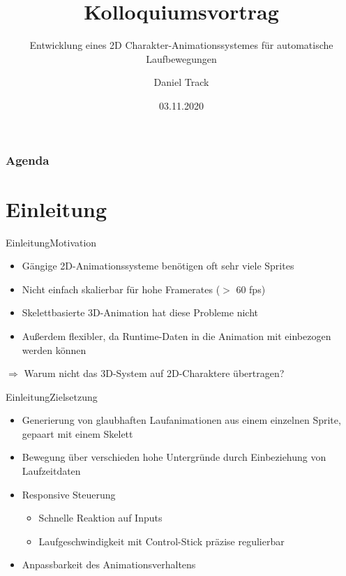 \documentclass[t,aspectratio=169,divpsnames]{beamer}
\title{Kolloquiumsvortrag}
\subtitle{Entwicklung eines 2D Charakter-Animationssystemes für automatische Laufbewegungen}
\author{Daniel Track}
\institute{Hochschule Trier}
\date{03.11.2020}
\begin{document}
\begin{frame}
    \titlepage
\end{frame}

\begin{frame}
    \frametitle{Agenda}
    \tableofcontents
\end{frame}

\section{Einleitung}
\begin{frame}{Einleitung}{Motivation}
    \begin{itemize}
        \item Gängige 2D-Animationssysteme benötigen oft sehr viele Sprites %
        \item Nicht einfach skalierbar für hohe Framerates ($>$ 60 fps)
        \item Skelettbasierte 3D-Animation hat diese Probleme nicht
        \item Außerdem flexibler, da Runtime-Daten in die Animation mit einbezogen werden können
    \end{itemize}

    $\Rightarrow$ Warum nicht das 3D-System auf 2D-Charaktere übertragen?
\end{frame}

\begin{frame}{Einleitung}{Zielsetzung}
    \begin{itemize}
        \item Generierung von glaubhaften Laufanimationen aus einem einzelnen Sprite, gepaart mit einem Skelett
        \item Bewegung über verschieden hohe Untergründe durch Einbeziehung von Laufzeitdaten
        \item Responsive Steuerung
              \begin{itemize}
                  \item Schnelle Reaktion auf Inputs
                  \item Laufgeschwindigkeit mit Control-Stick präzise regulierbar
              \end{itemize}
        \item Anpassbarkeit des Animationsverhaltens
    \end{itemize}
\end{frame}
\end{document}
